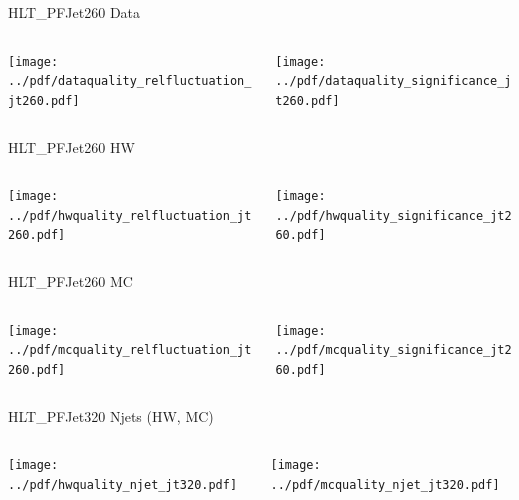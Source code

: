 \documentclass[9pt]{beamer}
\begin{document}
\begin{frame}[t]{HLT\_PFJet260 Data}
\begin{columns}[T]
  \begin{column}{.5\textwidth}
  \texttt{[image: ../pdf/dataquality\_relfluctuation\_jt260.pdf]}
  \end{column}
  \begin{column}{.5\textwidth}
  \texttt{[image: ../pdf/dataquality\_significance\_jt260.pdf]}
  \end{column}
\end{columns}
\end{frame}

\begin{frame}[t]{HLT\_PFJet260 HW}
\begin{columns}[T]
  \begin{column}{.5\textwidth}
  \texttt{[image: ../pdf/hwquality\_relfluctuation\_jt260.pdf]}
  \end{column}
  \begin{column}{.5\textwidth}
  \texttt{[image: ../pdf/hwquality\_significance\_jt260.pdf]}
  \end{column}
\end{columns}
\end{frame}

\begin{frame}[t]{HLT\_PFJet260 MC}
\begin{columns}[T]
  \begin{column}{.5\textwidth}
  \texttt{[image: ../pdf/mcquality\_relfluctuation\_jt260.pdf]}
  \end{column}
  \begin{column}{.5\textwidth}
  \texttt{[image: ../pdf/mcquality\_significance\_jt260.pdf]}
  \end{column}
\end{columns}
\end{frame}

\begin{frame}[t]{HLT\_PFJet320 Njets (HW, MC)}
\begin{columns}[T]
  \begin{column}{.5\textwidth}
  \texttt{[image: ../pdf/hwquality\_njet\_jt320.pdf]}
  \end{column}
  \begin{column}{.5\textwidth}
  \texttt{[image: ../pdf/mcquality\_njet\_jt320.pdf]}
  \end{column}
\end{columns}
\end{frame}
\end{document}
